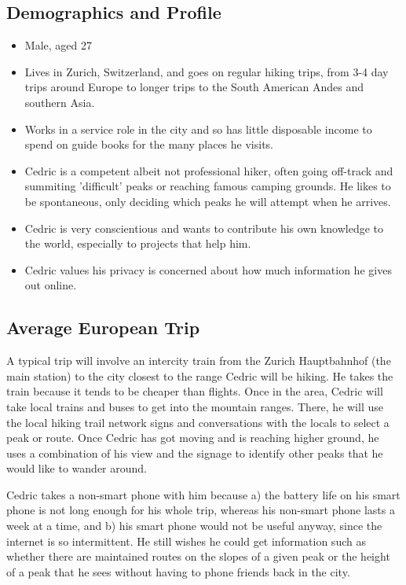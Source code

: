 \documentclass[authoryearcitations]{UoYCSproject}
\begin{document}
\subsection{Demographics and Profile}
\begin{itemize}
  \item Male, aged 27
  \item Lives in Zurich, Switzerland, and goes on regular hiking trips, from 3-4 day trips around Europe to longer trips to the South American Andes and southern Asia.
  \item Works in a service role in the city and so has little disposable income to spend on guide books for the many places he visits.
  \item Cedric is a competent albeit not professional hiker, often going off-track and summiting 'difficult' peaks or reaching famous camping grounds.  He likes to be spontaneous, only deciding which peaks he will attempt when he arrives.
  \item Cedric is very conscientious and wants to contribute his own knowledge to the world, especially to projects that help him.
  \item Cedric values his privacy is concerned about how much information he gives out online.
\end{itemize}
\subsection{Average European Trip}
A typical trip will involve an intercity train from the Zurich Hauptbahnhof (the main station) to the city closest to the range Cedric will be hiking.  He takes the train because it tends to be cheaper than flights.  Once in the area, Cedric will take local trains and buses to get into the mountain ranges.  There, he will use the local hiking trail network signs and conversations with the locals to select a peak or route.  Once Cedric has got moving and is reaching higher ground, he uses a combination of his view and the signage to identify other peaks that he would like to wander around.  

Cedric takes a non-smart phone with him because a) the battery life on his smart phone is not long enough for his whole trip, whereas his non-smart phone lasts a week at a time, and b) his smart phone would not be useful anyway, since the internet is so intermittent.  He still wishes he could get information such as whether there are maintained routes on the slopes of a given peak or the height of a peak that he sees without having to phone friends back in the city.
\newpage
\end{document}
